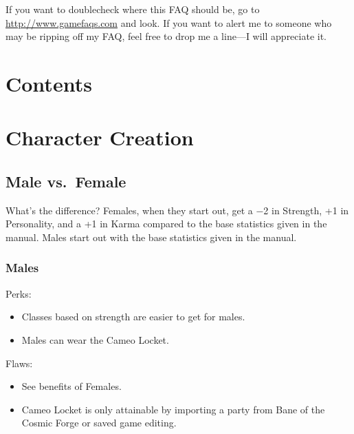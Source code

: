 \documentclass[10pt,twoside,openright]{report}
\newcommand{\WviiNeedSpace}{\Needspace*{4\baselineskip+\parskip}}
\newcommand{\WviiTwoColumnSetup}{\raggedcolumns\RaggedRight}
\begin{document}
If you want to doublecheck where this FAQ should be, go to
\url{http://www.gamefaqs.com} and look. If you want to alert me to
someone who may be ripping off my FAQ, feel free to drop me a line---I
will appreciate it.

\clearpage
\chapter*{Contents}
\begin{multicols}{2}\RaggedRight
\makeatletter
{}
\makeatother
\end{multicols}

\chapter{Character Creation}\label{character-creation}%
%
\section{Male vs.~Female}\label{male-vs.female}%
%
What's the difference? Females, when they start out, get a −2 in
Strength, +1 in Personality, and a +1 in Karma compared to the base
statistics given in the manual. Males start out with the base statistics
given in the manual.

\subsection{Males}\label{males}%
%
\begin{multicols}{2}\WviiTwoColumnSetup
\WviiNeedSpace{}Perks:%
\begin{itemize}
\item
  Classes based on strength are easier to get for males.
\item
  Males can wear the Cameo Locket.
\end{itemize}
\columnbreak

\WviiNeedSpace{}Flaws:%
\begin{itemize}
\item
  See benefits of Females.
\item
  Cameo Locket is only attainable by importing a party from Bane of the
  Cosmic Forge or saved game editing.
\end{itemize}
\end{multicols}
\end{document}
